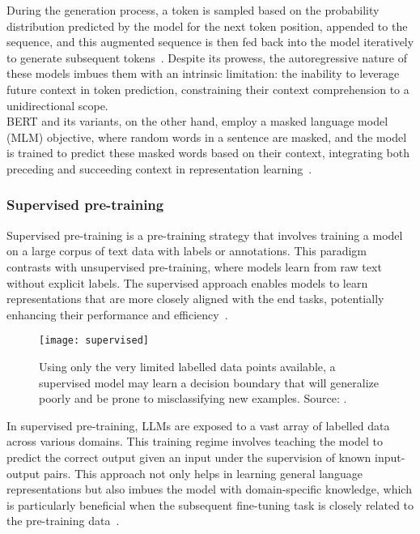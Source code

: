 During the generation process, a token is sampled based on the probability distribution predicted by the model for the next token position, appended to the sequence, and this augmented sequence is then fed back into the model iteratively to generate subsequent tokens~\cite{brown2020language}.
Despite its prowess, the autoregressive nature of these models imbues them with an intrinsic limitation: the inability to leverage future context in token prediction, constraining their context comprehension to a unidirectional scope.\\
BERT and its variants, on the other hand, employ a masked language model (MLM) objective, where random words in a sentence are masked, and the model is trained to predict these masked words based on their context, integrating both preceding and succeeding context in representation learning~\cite{devlin2019bert}.


\subsubsection{Supervised pre-training}
\label{subsubsec:supervised-pre-training}

Supervised pre-training is a pre-training strategy that involves training a model on a large corpus of text data with labels or annotations.
This paradigm contrasts with unsupervised pre-training, where models learn from raw text without explicit labels.
The supervised approach enables models to learn representations that are more closely aligned with the end tasks, potentially enhancing their performance and efficiency~\cite{gururangan2020don}.

\begin{figure}[h]
	\centering
	\texttt{[image: supervised]}
	\caption{Using only the very limited labelled data points available, a supervised model may learn a decision boundary that will generalize poorly and be prone to misclassifying new examples. Source: \textcite{bergmann2023semi}.}
	\label{fig:supervised}
\end{figure}

In supervised pre-training, LLMs are exposed to a vast array of labelled data across various domains.
This training regime involves teaching the model to predict the correct output given an input under the supervision of known input-output pairs.
This approach not only helps in learning general language representations but also imbues the model with domain-specific knowledge, which is particularly beneficial when the subsequent fine-tuning task is closely related to the pre-training data~\cite{phang2019sentence}.

